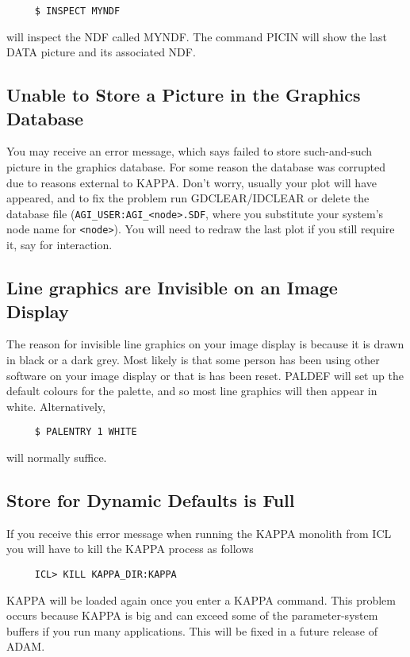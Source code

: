 {\small
\begin{verbatim}
     $ INSPECT MYNDF
\end{verbatim}
\normalsize
will inspect the NDF called MYNDF.  The command PICIN will
show the last DATA picture and its associated NDF.

\subsection{Unable to Store a Picture in the Graphics Database}
You may receive an error message, which says failed to store
such-and-such picture in the graphics database.  For some reason the
database was corrupted due to reasons external to {\small KAPPA}.  Don't
worry, usually your plot will have appeared, and to fix the problem run
GDCLEAR/IDCLEAR or delete the database file ({\tt AGI_USER:AGI_<node>.SDF},
where you substitute your system's node name for {\tt <node>}).
You will need to redraw the last plot if you still require it, say for
interaction.

\subsection{Line graphics are Invisible on an Image Display}
The reason for invisible line graphics on your image display
is because it is drawn in black or a dark grey.  Most likely is that
some person has been using other software on your image display or that
is has been reset.  PALDEF will set up the default colours for the
palette, and so most line graphics will then appear in white. 
Alternatively,

\small
\begin{verbatim}
     $ PALENTRY 1 WHITE
\end{verbatim}
\normalsize
will normally suffice.

\subsection{Store for Dynamic Defaults is Full}
If you receive this error message when running the {\small KAPPA} monolith
from {\small ICL} you will have to kill the {\small KAPPA} process as
follows

\small
\begin{verbatim}
     ICL> KILL KAPPA_DIR:KAPPA
\end{verbatim}
\normalsize
{\small KAPPA} will be loaded again once you enter a {\small KAPPA}
command.  This problem occurs because {\small KAPPA} is big and can
exceed some of the parameter-system buffers if you run many
applications.  This will be fixed in a future release of {\small ADAM}. 

}
